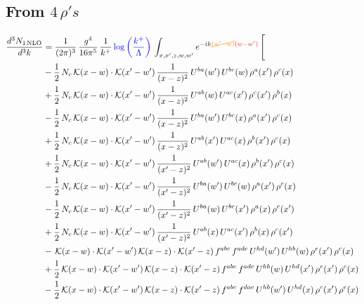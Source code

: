 \documentclass[9pt]{article}
\numberwithin{equation}{section}
\begin{document}
\subsection{From $4\, \rho's$}
\begin{align}
\frac{d^{3}N_{1\,\mathrm{NLO}}}{d^{3}k} & = \frac{1}{(2\pi)^{3}}\,\frac{g^{4}}{16\pi^{5}}\,\frac{1}{k^{+}}\,{\color{blue}\log{\left(\frac{k^{+}}{\Lambda}\right)}}\,\int_{x,x',z,w,w'}e^{-ik{\color{orange}\cancel{(w'-w)}}{\color{red}(w-w')}}\,\Bigg[\notag\\ & -\frac{1}{2}\,N_{c}\,\mathcal{K}(x-w)\cdot\mathcal{K}(x'-w')\,\frac{1}{(x-z)^{2}}\,U^{ba}(w')\,U^{bc}(w)\,\rho^{a}(x')\,\rho^{c}(x)\notag\\
& +\frac{1}{2}\,N_{c}\,\mathcal{K}(x-w)\cdot\mathcal{K}(x'-w')\,\frac{1}{(x-z)^{2}}\,U^{ab}(w)\,U^{ac}(x')\,\rho^{c}(x')\,\rho^{b}(x)\notag\\
& -\frac{1}{2}\,N_{c}\,\mathcal{K}(x-w)\cdot\mathcal{K}(x'-w')\,\frac{1}{(x-z)^{2}}\,U^{ba}(w')\,U^{bc}(x)\,\rho^{a}(x')\,\rho^{c}(x)\notag\\
& +\frac{1}{2}\,N_{c}\,\mathcal{K}(x-w)\cdot\mathcal{K}(x'-w')\,\frac{1}{(x-z)^{2}}\,U^{ab}(x')\,U^{ac}(x)\,\rho^{b}(x')\,\rho^{c}(x)\notag\\
& +\frac{1}{2}\,N_{c}\,\mathcal{K}(x-w)\cdot\mathcal{K}(x'-w')\,\frac{1}{(x'-z)^{2}}\,U^{ab}(w')\,U^{ac}(x)\,\rho^{b}(x')\,\rho^{c}(x)\notag\\
& -\frac{1}{2}\,N_{c}\,\mathcal{K}(x-w)\cdot\mathcal{K}(x'-w')\,\frac{1}{(x'-z)^{2}}\,U^{ba}(w')\,U^{bc}(w)\,\rho^{a}(x')\,\rho^{c}(x)\notag\\
& -\frac{1}{2}\,N_{c}\,\mathcal{K}(x-w)\cdot\mathcal{K}(x'-w')\,\frac{1}{(x'-z)^{2}}\,U^{ba}(w)\,U^{bc}(x')\,\rho^{a}(x)\,\rho^{c}(x')\notag\\
& +\frac{1}{2}\,N_{c}\,\mathcal{K}(x-w)\cdot\mathcal{K}(x'-w')\,\frac{1}{(x'-z)^{2}}\,U^{ab}(x)\,U^{ac}(x')\,\rho^{b}(x)\,\rho^{c}(x')\notag\\
& -\,\mathcal{K}(x-w)\cdot\mathcal{K}(x'-w')\,\mathcal{K}(x-z)\cdot\mathcal{K}(x'-z)\,f^{abc}\,f^{ade}\,U^{hd}(w')\,U^{hb}(w)\,\rho^{e}(x')\,\rho^{c}(x)\notag\\
& +\frac{1}{2}\,\mathcal{K}(x-w)\cdot\mathcal{K}(x'-w')\,\mathcal{K}(x-z)\cdot\mathcal{K}(x'-z)\,f^{abc}\,f^{ade}\,U^{hb}(w)\,U^{hd}(x')\,\rho^{e}(x')\,\rho^{c}(x)\notag\\
& -\frac{1}{2}\,\mathcal{K}(x-w)\cdot\mathcal{K}(x'-w')\,\mathcal{K}(x-z)\cdot\mathcal{K}(x'-z)\,f^{abc}\,f^{dae}\,U^{hb}(w')\,U^{hd}(x)\,\rho^{c}(x')\,\rho^{e}(x)\notag\\

\end{align}
\end{document}
